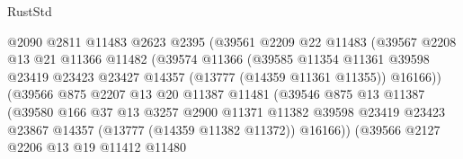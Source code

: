 \begin{lexlean}{RustStd}
\begin{coremodule}
                              @2090
                              @2811
                              @11483
                              @2623
                              @2395
                              (@39561
                                @2209
                                @22
                                @11483
                                (@39567
                                  @2208
                                  @13
                                  @21
                                  @11366
                                  @11482
                                  (@39574
                                    @11366
                                    (@39585
                                      @11354
                                      @11361
                                      @39598
                                      @23419
                                      @23423
                                      @23427
                                      @14357
                                      (@13777 (@14359 @11361 @11355))
                                      @16166))
                                  (@39566
                                    @875
                                    @2207
                                    @13
                                    @20
                                    @11387
                                    @11481
                                    (@39546
                                      @875
                                      @13
                                      @11387
                                      (@39580
                                        @166
                                        @37
                                        @13
                                        @3257
                                        @2900
                                        @11371
                                        @11382
                                        @39598
                                        @23419
                                        @23423
                                        @23867
                                        @14357
                                        (@13777 (@14359 @11382 @11372))
                                        @16166))
                                    (@39566
                                      @2127
                                      @2206
                                      @13
                                      @19
                                      @11412
                                      @11480

\end{coremodule}
\end{lexlean}
